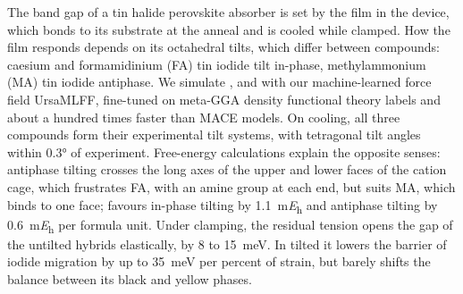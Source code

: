 {\changedcolor
The band gap of a tin halide perovskite absorber is set by the film in the device, which bonds to its substrate at the
anneal and is cooled while clamped. How the film responds depends on its octahedral tilts, which differ between
compounds: caesium and formamidinium (FA) tin iodide tilt in-phase, methylammonium (MA) tin iodide antiphase. We
simulate \CsSnI{}, \MASnI{} and \FASnI{} with our machine-learned force field UrsaMLFF, fine-tuned on meta-GGA density
functional theory labels and about a hundred times faster than MACE models. On cooling, all three compounds
form their experimental tilt systems, with tetragonal tilt angles within \ang{0.3} of experiment. Free-energy calculations explain the opposite senses: antiphase tilting crosses the long axes of the upper
and lower faces of the cation cage, which frustrates FA, with an amine group at each end, but suits MA, which binds to
one face; \FASnI{} favours in-phase tilting by \SI{1.1}{\milli\hartree} and \MASnI{} antiphase tilting by
\SI{0.6}{\milli\hartree} per formula unit. Under clamping, the residual tension opens the gap of the
untilted hybrids elastically, by 8 to \SI{15}{meV}. In tilted \CsSnI{} it lowers the barrier of iodide migration by up
to \SI{35}{meV} per percent of strain, but barely shifts the balance between its black and yellow phases.
}
